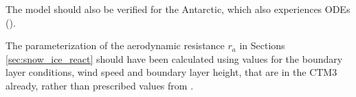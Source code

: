 \medskip

The model should also be verified for the Antarctic, which also experiences ODEs (\cite{Simpson2015}).


\medskip

The parameterization of the aerodynamic resistance $r_a$ in Sections \ref{sec:snow_ice_react} should have been calculated using values for the boundary layer conditions, wind speed and boundary layer height, that are in the CTM3 already, rather than prescribed values from \cite{CAO}. 